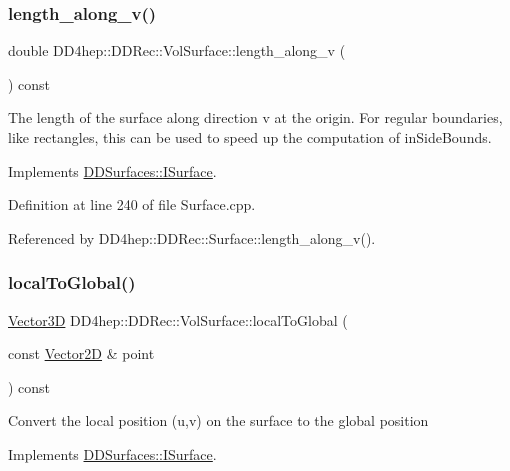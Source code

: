 \subsubsection{\texorpdfstring{length\+\_\+along\+\_\+v()}{length\_along\_v()}}
{\footnotesize\ttfamily double D\+D4hep\+::\+D\+D\+Rec\+::\+Vol\+Surface\+::length\+\_\+along\+\_\+v (\begin{DoxyParamCaption}{ }\end{DoxyParamCaption}) const\hspace{0.3cm}{\ttfamily [virtual]}}

The length of the surface along direction v at the origin. For \textquotesingle{}regular\textquotesingle{} boundaries, like rectangles, this can be used to speed up the computation of in\+Side\+Bounds. 

Implements \hyperlink{class_d_d_surfaces_1_1_i_surface_a9a4682bfa68557d53cfd319cfa54148d}{D\+D\+Surfaces\+::\+I\+Surface}.



Definition at line 240 of file Surface.\+cpp.



Referenced by D\+D4hep\+::\+D\+D\+Rec\+::\+Surface\+::length\+\_\+along\+\_\+v().

\hypertarget{class_d_d4hep_1_1_d_d_rec_1_1_vol_surface_a282f3288c62a9f794f25f6519d1a2f4d}{}\label{class_d_d4hep_1_1_d_d_rec_1_1_vol_surface_a282f3288c62a9f794f25f6519d1a2f4d} 
\subsubsection{\texorpdfstring{local\+To\+Global()}{localToGlobal()}}
{\footnotesize\ttfamily \hyperlink{class_d_d_surfaces_1_1_vector3_d}{Vector3D} D\+D4hep\+::\+D\+D\+Rec\+::\+Vol\+Surface\+::local\+To\+Global (\begin{DoxyParamCaption}\item[{const \hyperlink{class_d_d_surfaces_1_1_vector2_d}{Vector2D} \&}]{point }\end{DoxyParamCaption}) const\hspace{0.3cm}{\ttfamily [virtual]}}

Convert the local position (u,v) on the surface to the global position 

Implements \hyperlink{class_d_d_surfaces_1_1_i_surface_a39651d79f7969ac7402a6e2cfc37803c}{D\+D\+Surfaces\+::\+I\+Surface}.



